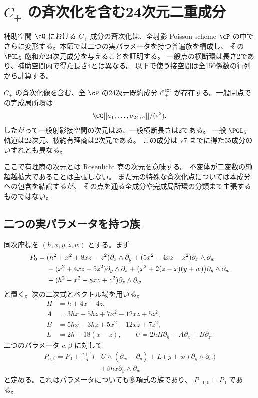 \section{\texorpdfstring{$C_+$}{Cplus} の斉次化を含む24次元二重成分}
\label{sec:cplus-family}

補助空間 $\cQ$ における $C_+$ 成分の斉次化は、全射影 Poisson scheme
$\cP$ の中でさらに変形する。本節では二つの実パラメータを持つ普遍族を構成し、
その $\PGL_5$ 飽和が24次元成分を与えることを証明する。
一般点の横断環は長さ2であり、補助空間内で得た長さ4とは異なる。
以下で使う接空間は全150係数の行列から計算する。

\begin{theorem}\label{thm:cplus-family}
$C_+$ の斉次化像を含む、全 $\cP$ の24次元既約成分
$\mathcal C_+^{\mathrm{ext}}$ が存在する。一般閉点での完成局所環は
\begin{equation}
 \CC[[a_1,\ldots,a_{24},\varepsilon]]/(\varepsilon^2).
 \label{eq:cplus-local-ring}
\end{equation}
したがって一般射影接空間の次元は25、一般横断長さは2である。
一般 $\PGL_5$ 軌道は22次元、被約有理商は2次元である。
この成分は v7 までに得た55成分のいずれとも異なる。
\end{theorem}

ここで有理商の次元とは Rosenlicht 商の次元を意味する。
不変体が二変数の純超越拡大であることは主張しない。
また元の特殊な斉次化点については本成分への包含を結論するが、
その点を通る全成分や完成局所環の分類まで主張するものではない。

\subsection{二つの実パラメータを持つ族}

同次座標を $(h,x,y,z,w)$ とする。まず
\begin{align}
 P_0={}&(h^2+x^2+8xz-z^2)\partial_x\wedge\partial_y
 +(5x^2-4xz-z^2)\partial_x\wedge\partial_w\notag\\
 &+(x^2+4xz-5z^2)\partial_y\wedge\partial_z
 +\bigl(x^2+2(z-x)(y+w)\bigr)\partial_y\wedge\partial_w\notag\\
 &+(h^2-x^2+8xz+z^2)\partial_z\wedge\partial_w
 \label{eq:cplus-special-point}
\end{align}
と置く。次の二次式とベクトル場を用いる。
\begin{align*}
 H&=h+4x-4z,\\
 A&=3hx-5hz+7x^2-12xz+5z^2,\\
 B&=5hx-3hz+5x^2-12xz+7z^2,\\
 L&=2h+18(x-z),\qquad
 U=2hH\partial_h-A\partial_x+B\partial_z.
\end{align*}
二つのパラメータ $c,\beta$ に対して
\begin{equation}
 \begin{split}
 P_{c,\beta}=P_0+\frac{c+1}{5}\bigl(&U\wedge(\partial_w-\partial_y)
                  +L(y+w)\partial_y\wedge\partial_w\bigr)\\
                  &+\beta hx\partial_y\wedge\partial_w
 \end{split}
 \label{eq:cplus-universal-family}
\end{equation}
と定める。これはパラメータについても多項式の族であり、
$P_{-1,0}=P_0$ である。

